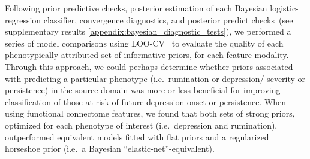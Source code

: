 \documentclass[
  notitlepage]{article}
\begin{document}
Following prior predictive checks, posterior estimation of each Bayesian
logistic-regression classifier, convergence diagnostics, and posterior
predict checks~\cite{Gabry2019}(see supplementary
results \ref{appendix:bayesian_diagnostic_tests}), we performed a series of model
comparisons using LOO-CV~\cite{Vehtari2016} to evaluate
the quality of each phenotypically-attributed set of informative priors,
for each feature modality. Through this approach, we could perhaps
determine whether priors associated with predicting a particular
phenotype (i.e.~rumination or depression/ severity or persistence) in
the source domain was more or less beneficial for improving
classification of those at risk of future depression onset or
persistence. When using functional connectome features, we found that
both sets of strong priors, optimized for each phenotype of interest
(i.e.~depression and rumination), outperformed equivalent models fitted
with flat priors and a regularized horseshoe prior (i.e.~a Bayesian
``elastic-net''-equivalent).
\end{document}
